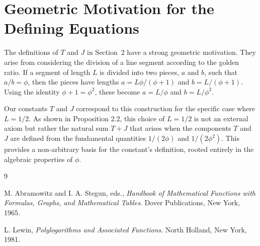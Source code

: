 \documentclass{amsart}
\theoremstyle{plain}
\theoremstyle{definition}
\theoremstyle{remark}
\begin{document}
\appendix
\section{Geometric Motivation for the Defining Equations}
\label{app:A}
The definitions of $T$ and $J$ in Section~2 have a strong geometric motivation. They arise from considering the division of a line segment according to the golden ratio. If a segment of length $L$ is divided into two pieces, $a$ and $b$, such that $a/b = \phi$, then the pieces have lengths $a = L\phi/(\phi+1)$ and $b=L/(\phi+1)$. Using the identity $\phi+1=\phi^2$, these become $a=L/\phi$ and $b=L/\phi^2$.

Our constants $T$ and $J$ correspond to this construction for the specific case where $L=1/2$. As shown in Proposition 2.2, this choice of $L=1/2$ is not an external axiom but rather the natural sum $T+J$ that arises when the components $T$ and $J$ are defined from the fundamental quantities $1/(2\phi)$ and $1/(2\phi^2)$. This provides a non-arbitrary basis for the constant's definition, rooted entirely in the algebraic properties of $\phi$.

\begin{thebibliography}{9}

M. Abramowitz and I. A. Stegun, eds.,
\textit{Handbook of Mathematical Functions with Formulas, Graphs, and Mathematical Tables}.
Dover Publications, New York, 1965.

L. Lewin,
\textit{Polylogarithms and Associated Functions}.
North Holland, New York, 1981.

\end{thebibliography}
\end{document}
